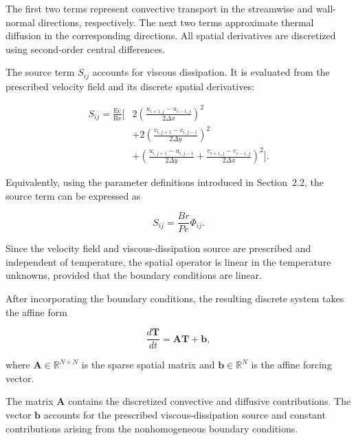 The first two terms represent convective transport in the
streamwise and wall-normal directions, respectively. The
next two terms approximate thermal diffusion in the
corresponding directions. All spatial derivatives are
discretized using second-order central differences.

The source term $S_{ij}$ accounts for viscous dissipation.
It is evaluated from the prescribed velocity field and its
discrete spatial derivatives:

\begin{equation}
\begin{aligned}
    S_{ij}
    =\frac{\mathrm{Ec}}{\mathrm{Re}}
    \Bigg[
    &2\left(
    \frac{u_{i+1,j}-u_{i-1,j}}{2\Delta x}
    \right)^2
    \\[4pt]
    &+2\left(
    \frac{v_{i,j+1}-v_{i,j-1}}{2\Delta y}
    \right)^2
    \\[4pt]
    &+\left(
    \frac{u_{i,j+1}-u_{i,j-1}}{2\Delta y}
    +
    \frac{v_{i+1,j}-v_{i-1,j}}{2\Delta x}
    \right)^2
    \Bigg].
\end{aligned}
\label{eq:discrete_viscous_source}
\end{equation}

Equivalently, using the parameter definitions introduced in
Section~2.2, the source term can be expressed as

\begin{equation}
    S_{ij}=\frac{Br}{Pe}\Phi_{ij}.
\end{equation}

Since the velocity field and viscous-dissipation source are
prescribed and independent of temperature, the spatial operator
is linear in the temperature unknowns, provided that the
boundary conditions are linear.

After incorporating the boundary conditions, the resulting
discrete system takes the affine form

\begin{equation}
    \boxed{
    \frac{d\mathbf{T}}{dt}
    =\mathbf{A}\mathbf{T}+\mathbf{b},
    }
    \label{eq:semi_discrete_system}
\end{equation}

where $\mathbf{A}\in\mathbb{R}^{N\times N}$ is the sparse
spatial matrix and $\mathbf{b}\in\mathbb{R}^{N}$ is the
affine forcing vector.

The matrix $\mathbf{A}$ contains the discretized convective
and diffusive contributions. The vector $\mathbf{b}$ accounts
for the prescribed viscous-dissipation source and constant
contributions arising from the nonhomogeneous boundary
conditions.

